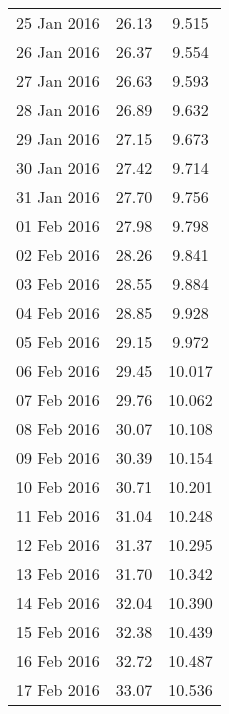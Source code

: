 \documentclass[11pt,a4paper,twoside]{article}
\begin{document}
\begin{longtable}{lcc}
25 Jan 2016                    & 26.13                & 9.515      \\
26 Jan 2016                    & 26.37                & 9.554      \\
27 Jan 2016                    & 26.63                & 9.593      \\
28 Jan 2016                    & 26.89                & 9.632      \\
29 Jan 2016                    & 27.15                & 9.673      \\
30 Jan 2016                    & 27.42                & 9.714      \\
31 Jan 2016                    & 27.70                & 9.756      \\
01 Feb 2016                    & 27.98                & 9.798      \\
02 Feb 2016                    & 28.26                & 9.841      \\
03 Feb 2016                    & 28.55                & 9.884      \\
04 Feb 2016                    & 28.85                & 9.928      \\
05 Feb 2016                    & 29.15                & 9.972      \\
06 Feb 2016                    & 29.45                & 10.017     \\
07 Feb 2016                    & 29.76                & 10.062     \\
08 Feb 2016                    & 30.07                & 10.108     \\
09 Feb 2016                    & 30.39                & 10.154     \\
10 Feb 2016                    & 30.71                & 10.201     \\
11 Feb 2016                    & 31.04                & 10.248     \\
12 Feb 2016                    & 31.37                & 10.295     \\
13 Feb 2016                    & 31.70                & 10.342     \\
14 Feb 2016                    & 32.04                & 10.390     \\
15 Feb 2016                    & 32.38                & 10.439     \\
16 Feb 2016                    & 32.72                & 10.487     \\
17 Feb 2016                    & 33.07                & 10.536     \\

\end{longtable}
\end{document}
